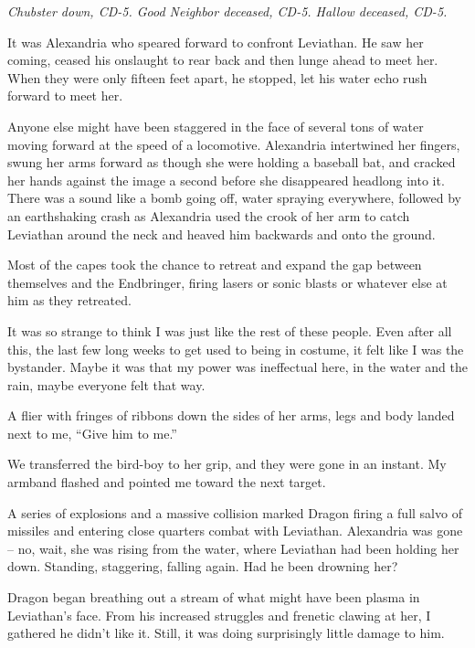 \emph{Chubster down, CD-5. Good Neighbor deceased, CD-5.  Hallow deceased, CD-5.}



It was Alexandria who speared forward to confront Leviathan.  He saw her coming, ceased his onslaught to rear back and then lunge ahead to meet her.  When they were only fifteen feet apart, he stopped, let his water echo rush forward to meet her.



Anyone else might have been staggered in the face of several tons of water moving forward at the speed of a locomotive.  Alexandria intertwined her fingers, swung her arms forward as though she were holding a baseball bat, and cracked her hands against the image a second before she disappeared headlong into it.  There was a sound like a bomb going off, water spraying everywhere, followed by an earthshaking crash as Alexandria used the crook of her arm to catch Leviathan around the neck and heaved him backwards and onto the ground.



Most of the capes took the chance to retreat and expand the gap between themselves and the Endbringer, firing lasers or sonic blasts or whatever else at him as they retreated.



It was so strange to think I was just like the rest of these people.  Even after all this, the last few long weeks to get used to being in costume, it felt like I was the bystander.  Maybe it was that my power was ineffectual here, in the water and the rain, maybe everyone felt that way.



A flier with fringes of ribbons down the sides of her arms, legs and body landed next to me, ``Give him to me.''



We transferred the bird-boy to her grip, and they were gone in an instant.  My armband flashed and pointed me toward the next target.



A series of explosions and a massive collision marked Dragon firing a full salvo of missiles and entering close quarters combat with Leviathan.  Alexandria was gone – no, wait, she was rising from the water, where Leviathan had been holding her down.  Standing, staggering, falling again.  Had he been drowning her?



Dragon began breathing out a stream of what might have been plasma in Leviathan's face.  From his increased struggles and frenetic clawing at her, I gathered he didn't like it.  Still, it was doing surprisingly little damage to him.




